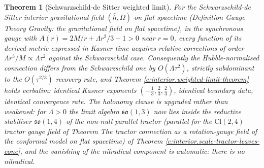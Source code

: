 \documentclass[11pt]{article}
\newtheorem{theorem}{Theorem}[section]
\theoremstyle{definition}
\theoremstyle{plain}
\newcommand{\changedmark}[2]{\marginpar{\raggedright\scriptsize\color{#1}#2}}
\providecommand{\Cl}{}\renewcommand{\Cl}{\mathrm{Cl}}
\providecommand{\hb}{}\renewcommand{\hb}{\bar{h}}
\begin{document}
\begin{theorem}[Schwarzschild-de Sitter weighted limit]\label{c:interior.schwarzschild-de-sitter-weighted-limit}
\changedmark{gray}{reworded}
For the Schwarzschild-de Sitter interior gravitational field $(\hb, \Omega)$ on flat spacetime (Definition \emph{Gauge Theory Gravity: the gravitational field on flat spacetime}), in the synchronous gauge with $A(r) = 2M/r + \Lambda r^2/3 - 1 > 0$ near $r = 0$, every function of its derived metric expressed in Kasner time acquires relative corrections of order $\Lambda r^3/M \propto \Lambda\tau^2$ against the Schwarzschild case. Consequently the Hubble-normalised connection differs from the Schwarzschild one by $O(\Lambda\tau^2)$, strictly subdominant to the $O(\tau^{2/3})$ recovery rate, and Theorem \ref{c:interior.weighted-limit-theorem} holds verbatim: identical Kasner exponents $(-\tfrac13, \tfrac23, \tfrac23)$, identical boundary data, identical convergence rate. The holonomy clause is upgraded rather than weakened: for $\Lambda > 0$ the limit algebra $\mathfrak{so}(1,3)$ now lies inside the \emph{reductive} stabiliser $\mathfrak{so}(1,4)$ of the non-null parallel tractor (parallel for the $\Cl(2,4)$ tractor gauge field of Theorem \emph{The tractor connection as a rotation-gauge field of the conformal model on flat spacetime}) of Theorem \ref{c:interior.scale-tractor-leaves-cone}, and the vanishing of the nilradical component is automatic: there is no nilradical.
\end{theorem}
\end{document}
